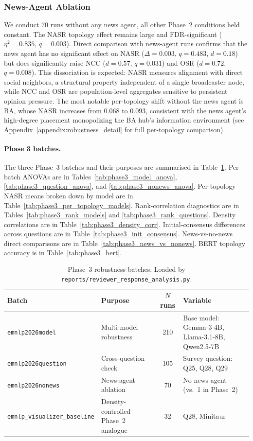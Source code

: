 \documentclass[11pt]{article}
\begin{document}
\subsubsection{News-Agent Ablation}

We conduct 70 runs without any news agent, all other Phase~2 conditions held constant. The NASR topology effect remains large and FDR-significant ($\eta^2 = 0.835$, $q = 0.003$). Direct comparison with news-agent runs confirms that the news agent has no significant effect on NASR ($\Delta = 0.003$, $q = 0.483$, $d = 0.18$) but does significantly raise NCC ($d = 0.57$, $q = 0.031$) and OSR ($d = 0.72$, $q = 0.008$). This dissociation is expected: NASR measures alignment with direct social neighbors, a structural property independent of a single broadcaster node, while NCC and OSR are population-level aggregates sensitive to persistent opinion pressure. The most notable per-topology shift without the news agent is BA, whose NASR increases from 0.068 to 0.093, consistent with the news agent's high-degree placement monopolizing the BA hub's information environment (see Appendix~\ref{appendix:robustness_detail} for full per-topology comparison).
\paragraph{Phase 3 batches.} The three Phase~3 batches and their purposes are summarised in Table~\ref{tab:phase3_batches}. Per-batch ANOVAs are in Tables~\ref{tab:phase3_model_anova}, \ref{tab:phase3_question_anova}, and \ref{tab:phase3_nonews_anova}. Per-topology NASR means broken down by model are in Table~\ref{tab:phase3_per_topology_models}. Rank-correlation diagnostics are in Tables~\ref{tab:phase3_rank_models} and \ref{tab:phase3_rank_questions}. Density correlations are in Table~\ref{tab:phase3_density_corr}. Initial-consensus differences across questions are in Table~\ref{tab:phase3_init_consensus}. News-vs-no-news direct comparisons are in Table~\ref{tab:phase3_news_vs_nonews}. BERT topology accuracy is in Table~\ref{tab:phase3_bert}.

\begin{table}[h]
\centering
\small
\begin{tabular}{llcl}
\toprule
Batch & Purpose & $N$ runs & Variable \\
\midrule
\texttt{emnlp2026model}    & Multi-model robustness  & 210 & Base model: Gemma-3-4B, Llama-3.1-8B, Qwen2.5-7B \\
\texttt{emnlp2026question} & Cross-question check    & 105 & Survey question: Q25, Q28, Q29 \\
\texttt{emnlp2026nonews}   & News-agent ablation     & 70  & No news agent (vs.\ 1 in Phase~2) \\
\texttt{emnlp\_visualizer\_baseline} & Density-controlled Phase~2 analogue & 32 & Q28, Minitaur \\
\bottomrule
\end{tabular}
\caption{Phase~3 robustness batches. Loaded by \texttt{reports/reviewer\_response\_analysis.py}.}
\label{tab:phase3_batches}
\end{table}
\end{document}
